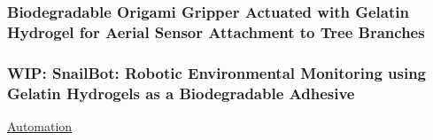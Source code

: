 \subsubsection{Biodegradable Origami Gripper Actuated with Gelatin Hydrogel for Aerial Sensor Attachment to Tree Branches \cite{Geckeler2023b}}

\subsubsection{WIP: SnailBot: Robotic Environmental Monitoring using Gelatin Hydrogels as a Biodegradable Adhesive}

\underline{Automation}
